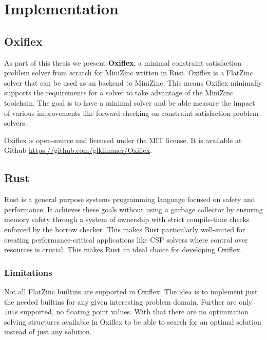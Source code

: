 \chapter{Implementation} \label{chap:impl}


\section{Oxiflex}

As part of this thesis we present \textbf{Oxiflex}, a minimal constraint satisfaction problem solver from scratch for MiniZinc written in Rust. Oxiflex is a FlatZinc solver that can be used as an backend to MiniZinc. This means Oxiflex minimally supports the requirements for a solver to take advantage of the MiniZinc toolchain. The goal is to have a minimal solver and be able measure the impact of various improvements like forward checking on constraint satisfaction problem solvers.

Oxiflex is open-source and licensed under the MIT license. It is available at Github \url{https://github.com/glklimmer/Oxiflex}.

\section{Rust}

Rust \cite{rust:2014} is a general purpose systems programming language focused on safety and performance. It achieves these goals without using a garbage collector by ensuring memory safety through a system of ownership with strict compile-time checks enforced by the borrow checker. This makes Rust particularly well-suited for creating performance-critical applications like CSP solvers where control over resources is crucial. This makes Rust an ideal choice for developing Oxiflex.

\subsection{Limitations}

Not all FlatZinc builtins are supported in Oxiflex. The idea is to implement just the needed builtins for any given interesting problem domain. Further are only \verb|int|s supported, no floating point values. With that there are no optimization solving structures available in Oxiflex to be able to search for an optimal solution instead of just any solution.


